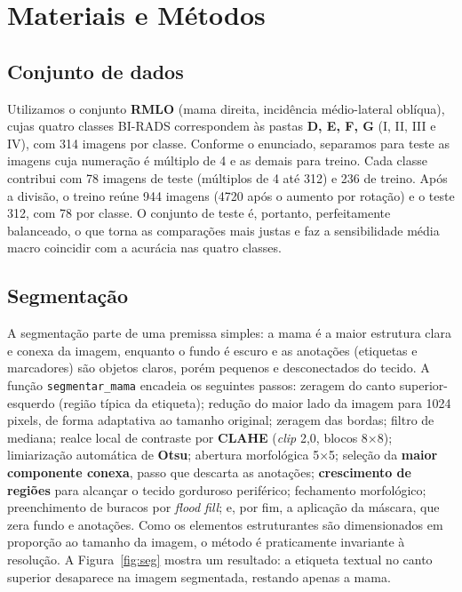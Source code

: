 \documentclass[twocolumn,a4paper,11pt]{article}
\begin{document}
\section{Materiais e Métodos}

\subsection{Conjunto de dados}

Utilizamos o conjunto \textbf{RMLO} (mama direita, incidência médio\nobreakdash-lateral
oblíqua), cujas quatro classes BI\nobreakdash-RADS correspondem às pastas \textbf{D, E, F, G}
(I, II, III e IV), com 314 imagens por classe. Conforme o enunciado, separamos para
teste as imagens cuja numeração é múltiplo de 4 e as demais para treino. Cada
classe contribui com 78 imagens de teste (múltiplos de 4 até 312) e 236 de treino.
Após a divisão, o treino reúne 944 imagens (4720 após o aumento por rotação) e o
teste 312, com 78 por classe. O conjunto de teste é, portanto, perfeitamente
balanceado, o que torna as comparações mais justas e faz a sensibilidade média
macro coincidir com a acurácia nas quatro classes.

\subsection{Segmentação}

A segmentação parte de uma premissa simples: a mama é a maior estrutura clara e
conexa da imagem, enquanto o fundo é escuro e as anotações (etiquetas e
marcadores) são objetos claros, porém pequenos e desconectados do tecido. A função
\texttt{segmentar\_mama} encadeia os seguintes passos: zeragem do canto
superior\nobreakdash-esquerdo (região típica da etiqueta); redução do maior lado da imagem
para 1024 pixels, de forma adaptativa ao tamanho original; zeragem das bordas;
filtro de mediana; realce local de contraste por \textbf{CLAHE} (\textit{clip}
2,0, blocos 8$\times$8); limiarização automática de \textbf{Otsu}; abertura
morfológica 5$\times$5; seleção da \textbf{maior componente conexa}, passo que
descarta as anotações; \textbf{crescimento de regiões} para alcançar o tecido
gorduroso periférico; fechamento morfológico; preenchimento de buracos por
\textit{flood fill}; e, por fim, a aplicação da máscara, que zera fundo e
anotações. Como os elementos estruturantes são dimensionados em proporção ao
tamanho da imagem, o método é praticamente invariante à resolução. A
Figura~\ref{fig:seg} mostra um resultado: a etiqueta textual no canto superior
desaparece na imagem segmentada, restando apenas a mama.
\end{document}
